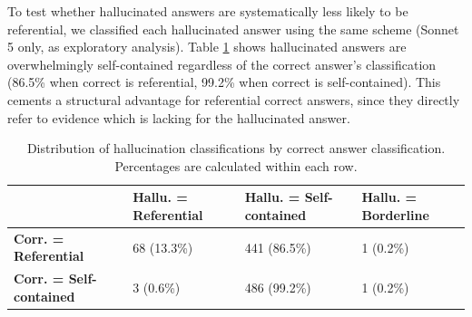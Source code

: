 \documentclass{article}
\begin{document}
To test whether hallucinated answers are systematically less likely to be referential, we classified each hallucinated answer using the same scheme (Sonnet 5 only, as exploratory analysis). Table \ref{tab:hallu_vs_correct_answer} shows hallucinated answers are overwhelmingly self-contained regardless of the correct answer's classification (86.5\% when correct is referential, 99.2\% when correct is self-contained). This cements a structural advantage for referential correct answers, since they directly refer to evidence which is lacking for the hallucinated answer. 

\begin{table}[h!]
\centering
\begin{tabularx}{\textwidth}{l|XXX}
\toprule
 &
\textbf{Hallu. = Referential} &
\textbf{Hallu. = Self-contained} &
\textbf{Hallu. = Borderline} \\
\midrule
\textbf{Corr. = Referential} &
68 (13.3\%) &
441 (86.5\%) &
1 (0.2\%) \\
\textbf{Corr. = Self-contained} &
3 (0.6\%) &
486 (99.2\%) &
1 (0.2\%) \\
\bottomrule
\end{tabularx}
\caption{Distribution of hallucination classifications by correct answer classification. Percentages are calculated within each row.}
\label{tab:hallu_vs_correct_answer}
\end{table}
\end{document}
